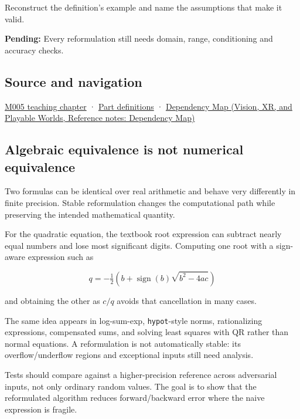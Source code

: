 Reconstruct the definition's example and name the assumptions that make it valid.

\textbf{Pending:} Every reformulation still needs domain, range, conditioning and accuracy checks.

\subsection{Source and navigation}\label{appendix-d7f8ba961670-source-and-navigation}

\hyperref[01-foundations-i-ch001-when-arithmetic-meets-uncertainty]{M005 teaching chapter} · \hyperref[appendix-fd090d982a15-m005---parts-77-88]{Part definitions} · \href{../07-Vision-XR-and-Playable-Worlds/main.pdf\#nameddest=appendix-4ad47bdd269a}{Dependency Map (Vision, XR, and Playable Worlds, Reference notes: Dependency Map)}

\subsection{Algebraic equivalence is not numerical equivalence}\label{appendix-d7f8ba961670-algebraic-equivalence-is-not-numerical-equivalence}

Two formulas can be identical over real arithmetic and behave very differently in finite precision. Stable reformulation changes the computational path while preserving the intended mathematical quantity.

For the quadratic equation, the textbook root expression can subtract nearly equal numbers and lose most significant digits. Computing one root with a sign-aware expression such as

\[
q=-\tfrac12\left(b+\operatorname{sign}(b)\sqrt{b^2-4ac}\right)
\]

and obtaining the other as \(c/q\) avoids that cancellation in many cases.

The same idea appears in log-sum-exp, \texttt{hypot}-style norms, rationalizing expressions, compensated sums, and solving least squares with QR rather than normal equations. A reformulation is not automatically stable: its overflow/underflow regions and exceptional inputs still need analysis.

Tests should compare against a higher-precision reference across adversarial inputs, not only ordinary random values. The goal is to show that the reformulated algorithm reduces forward/backward error where the naive expression is fragile.

